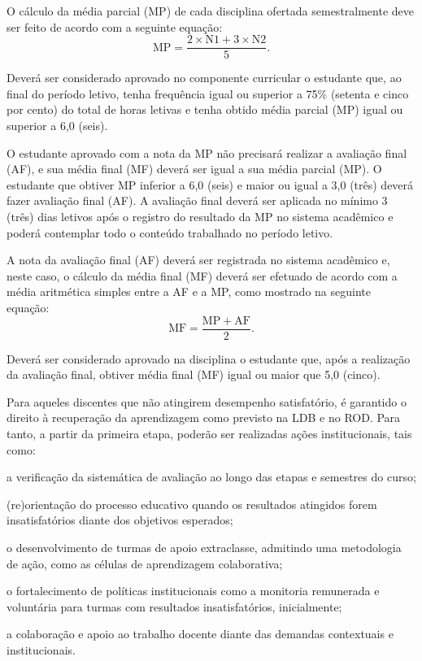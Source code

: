 \documentclass[
	12pt,				%
	openright,			%
	twoside,			%
	a4paper,			%
	chapter=TITLE,		%
	english,			%
	french,				%
	spanish,			%
	brazil,				%
	]{abntex2}
\begin{document}
O cálculo da média parcial (MP) de cada disciplina ofertada semestralmente deve ser feito de acordo com a seguinte equação:
\[
    \mathrm{MP} = \frac{2 \times \mathrm{N1} + 3 \times \mathrm{N2}}{5}.
\]

Deverá ser considerado aprovado no componente curricular o estudante que, ao final do período letivo, tenha frequência igual ou superior a 75\% (setenta e cinco por cento) do total de horas letivas e tenha obtido média parcial (MP) igual ou superior a 6,0 (seis). 

O estudante aprovado com a nota da MP não precisará realizar a avaliação final (AF), e sua média final (MF) deverá ser igual a sua média parcial (MP). O estudante que obtiver MP inferior a 6,0 (seis) e maior ou igual a 3,0 (três) deverá fazer avaliação final (AF). A avaliação final deverá ser aplicada no mínimo 3 (três) dias letivos após o registro do resultado da MP no sistema acadêmico e poderá contemplar todo o conteúdo trabalhado no período letivo.

A nota da avaliação final (AF) deverá ser registrada no sistema acadêmico e, neste caso, o cálculo da média final (MF) deverá ser efetuado de acordo com a média aritmética simples entre a AF e a MP, como mostrado na seguinte equação:
\[
    \mathrm{MF} = \frac{ \mathrm{MP} + \mathrm{AF}}{2}.
\]

Deverá ser considerado aprovado na disciplina o estudante que, após a realização da avaliação final, obtiver média final (MF) igual ou maior que 5,0 (cinco).

Para aqueles discentes que não atingirem desempenho satisfatório, é garantido o direito à recuperação da aprendizagem como previsto na LDB e no ROD. Para tanto, a partir da primeira etapa, poderão ser realizadas ações institucionais, tais como:
\begin{alineas}
	\item a verificação da sistemática de avaliação ao longo das etapas e semestres do curso;
 	\item (re)orientação do processo educativo quando os resultados atingidos forem insatisfatórios diante dos objetivos esperados;
 	\item o desenvolvimento de turmas de apoio extraclasse, admitindo uma metodologia de ação, como as células de aprendizagem colaborativa;
 	\item o fortalecimento de políticas institucionais como a monitoria remunerada e voluntária para turmas com resultados insatisfatórios, inicialmente;
 	\item a colaboração e apoio ao trabalho docente diante das demandas contextuais e institucionais.
\end{alineas}
\end{document}
